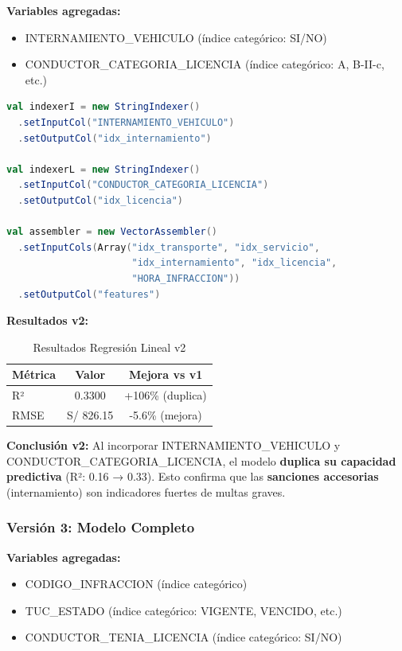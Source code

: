 \documentclass[12pt,a4paper]{article}
\begin{document}
\textbf{Variables agregadas:}
\begin{itemize}
    \item INTERNAMIENTO\_VEHICULO (índice categórico: SI/NO)
    \item CONDUCTOR\_CATEGORIA\_LICENCIA (índice categórico: A, B-II-c, etc.)
\end{itemize}

\begin{lstlisting}[language=Scala, caption={Regresión Lineal v2 - Agrega internamiento y licencia}]
val indexerI = new StringIndexer()
  .setInputCol("INTERNAMIENTO_VEHICULO")
  .setOutputCol("idx_internamiento")

val indexerL = new StringIndexer()
  .setInputCol("CONDUCTOR_CATEGORIA_LICENCIA")
  .setOutputCol("idx_licencia")

val assembler = new VectorAssembler()
  .setInputCols(Array("idx_transporte", "idx_servicio", 
                      "idx_internamiento", "idx_licencia", 
                      "HORA_INFRACCION"))
  .setOutputCol("features")
\end{lstlisting}

\textbf{Resultados v2:}

\begin{table}[H]
\centering
\begin{tabular}{lcc}
\toprule
\textbf{Métrica} & \textbf{Valor} & \textbf{Mejora vs v1} \\
\midrule
R² & 0.3300 & +106\% (duplica) \\
RMSE & S/ 826.15 & -5.6\% (mejora) \\
\bottomrule
\end{tabular}
\caption{Resultados Regresión Lineal v2}
\label{tab:lr_v2}
\end{table}

\textbf{Conclusión v2:} Al incorporar INTERNAMIENTO\_VEHICULO y CONDUCTOR\_CATEGORIA\_LICENCIA, el modelo \textbf{duplica su capacidad predictiva} (R²: 0.16 → 0.33). Esto confirma que las \textbf{sanciones accesorias} (internamiento) son indicadores fuertes de multas graves.

\subsubsection{Versión 3: Modelo Completo}

\textbf{Variables agregadas:}
\begin{itemize}
    \item CODIGO\_INFRACCION (índice categórico)
    \item TUC\_ESTADO (índice categórico: VIGENTE, VENCIDO, etc.)
    \item CONDUCTOR\_TENIA\_LICENCIA (índice categórico: SI/NO)
\end{itemize}
\end{document}
